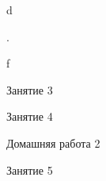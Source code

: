 %
%

\begin{class}[number=1]
	\begin{listofex}
		\item d
	\end{listofex}
\end{class}

\begin{class}[number=2]
	\begin{listofex}
		\item .
	\end{listofex}
\end{class}

\begin{homework}[number=1]
	\begin{listofex}
		\item f
	\end{listofex}
\end{homework}

\begin{class}[number=3]
	\begin{listofex}
		\item Занятие 3 
	\end{listofex}
\end{class}

\begin{class}[number=4]
	\begin{listofex}
		\item Занятие 4
	\end{listofex}
\end{class}

\begin{homework}[number=2]
	\begin{listofex}
		\item Домашняя работа 2
	\end{listofex}
\end{homework}

\begin{class}[number=5]
	\begin{listofex}
		\item Занятие 5
	\end{listofex}
\end{class}

